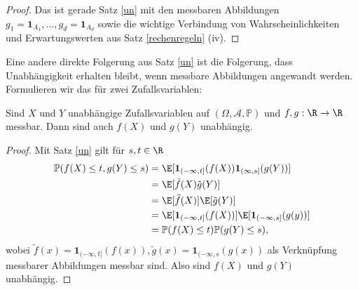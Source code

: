 \begin{proof}
	Das ist gerade Satz \ref{un} mit den messbaren Abbildungen $g_1=\mathbf{1}_{A_1},...,g_d=\mathbf{1}_{A_d}$ sowie die wichtige Verbindung von Wahrscheinlichkeiten und Erwartungswerten aus Satz \ref{rechenregeln} (iv).
\end{proof}
Eine andere direkte Folgerung aus Satz \ref{un} ist die Folgerung, dass Unabh\"angigkeit erhalten bleibt, wenn messbare Abbildungen angewandt werden. Formulieren wir das f\"ur zwei Zufallsvariablen:
\begin{korollar}
	Sind $X$ und $Y$ unabh\"angige Zufallsvariablen auf $(\Omega, \mathcal A, \mathbb P)$ und $f, g:\R\to \R$ messbar. Dann sind auch $f(X)$ und $g(Y)$ unabh\"angig.	
\end{korollar}
\begin{proof}
	Mit Satz \ref{un} gilt f\"ur $s, t\in \R$
	\begin{align*}
		\mathbb P(f(X)\leq t, g(Y)\leq s)&=\E[\mathbf 1_{(-\infty,t]}(f(X)) \mathbf 1_{(\infty,s]}(g(Y))]\\
		&= \E[\tilde f(X) \tilde g(Y)]\\
				&= \E[\tilde f(X)]\E[ \tilde g(Y)]\\
		&=\E[\mathbf 1_{(-\infty,t]}(f(X))] \E[\mathbf 1_{(-\infty,s]}(g(y))]\\
		&=\mathbb P(f(X)\leq t) \mathbb P( g(Y)\leq s),
	\end{align*}
	wobei $\tilde f(x)=\mathbf 1_{(-\infty,t]}(f(x)), \tilde g(x)=\mathbf 1_{(-\infty,s}(g(x))$ als Verkn\"upfung messbarer Abbildungen messbar sind. Also sind $f(X)$ und $g(Y)$ unabh\"angig.
\end{proof}


